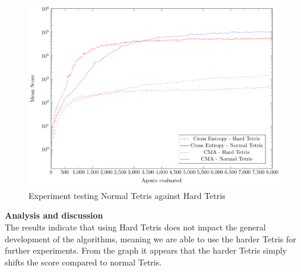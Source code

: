 \begin{figure}[H]
\centering
\includegraphics[scale=1]{data/complexity/mean/PlotFile.pdf}
\caption{Experiment testing Normal Tetris against Hard Tetris}
\end{figure}

\textbf{Analysis and discussion}\\
The results indicate that using Hard Tetris does not impact the general development of the algorithms, meaning we are able to use the harder Tetris for further experiments. From the graph it appears that the harder Tetris simply shifts the score compared to normal Tetris.
\\


